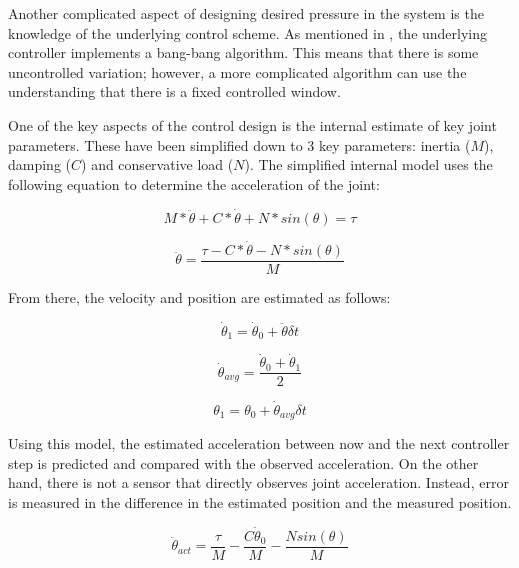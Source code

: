 Another complicated aspect of designing desired pressure in the system is the
knowledge of the underlying control scheme. As mentioned in \cite{HuntPMuscles},
the underlying controller implements a bang-bang algorithm. This means that 
there is some uncontrolled variation; however, a more complicated algorithm
can use the understanding that there is a fixed controlled window.


One of the key aspects of the control design is the internal estimate of key 
joint parameters. These have been simplified down to 3 key parameters: inertia 
($M$), damping ($C$) and conservative load ($N$). The simplified internal 
model uses the following equation to determine the acceleration of the joint:

\begin{equation}
M * \ddot{\theta} + C * \dot{\theta} + N * sin(\theta) = \tau
\end{equation}

\begin{equation}
\ddot{\theta} = \dfrac{\tau - C * \dot{\theta} - N * sin(\theta)}{M}
\end{equation}

From there, the velocity and position are estimated as follows:

\begin{equation}
\dot{\theta}_{1} = \dot{\theta}_{0} + \ddot{\theta} \delta t
\end{equation}

\begin{equation}
\dot{\theta}_{avg} = \dfrac{\dot{\theta}_{0} + \dot{\theta}_{1}}{2}
\end{equation}

\begin{equation}
\theta_{1} = \theta_{0} + \dot{\theta}_{avg} \delta t
\end{equation}

Using this model, the estimated acceleration between now and the next controller 
step is predicted and compared with the observed acceleration. On the other hand,
there is not a sensor that directly observes joint acceleration. Instead, error
is measured in the difference in the estimated position and the measured 
position.


\begin{equation}
\ddot{\theta}_{act} = \dfrac{\tau}{M} - \dfrac{C \dot{\theta}_{0}}{M} - \dfrac{N sin(\theta)}{M}
\end{equation}

